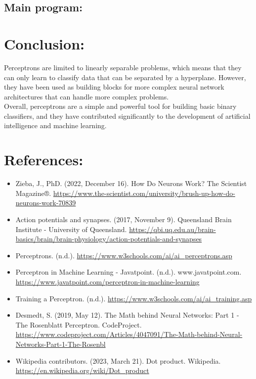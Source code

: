 \documentclass[12pt]{article}
\begin{document}
\subsection{Main program:}

\section{Conclusion:}
Perceptrons are limited to linearly separable problems, which means that they can only learn to
classify data that can be separated by a hyperplane. However, they have been used as building blocks
for more
complex neural network architectures that can handle more complex problems.\\
Overall, perceptrons are a simple and powerful tool for building basic binary classifiers, and
they have contributed significantly to the development of artificial intelligence and machine learning.


\section{References:}
\begin{itemize}
\item Zieba, J., PhD. (2022, December 16). How Do Neurons Work? The Scientist Magazine®.
  \url{https://www.the-scientist.com/university/brush-up-how-do-neurons-work-70839}
\item Action potentials and synapses. (2017, November 9). Queensland Brain Institute - University
  of Queensland.
  \url{https://qbi.uq.edu.au/brain-basics/brain/brain-physiology/action-potentials-and-synapses}
\item Perceptrons. (n.d.). \url{https://www.w3schools.com/ai/ai_perceptrons.asp}
\item Perceptron in Machine Learning - Javatpoint. (n.d.). www.javatpoint.com.
  \url{https://www.javatpoint.com/perceptron-in-machine-learning}
\item Training a Perceptron. (n.d.). \url{https://www.w3schools.com/ai/ai_training.asp}
\item Desmedt, S. (2019, May 12). The Math behind Neural Networks: Part 1 - The Rosenblatt Perceptron.
  CodeProject.
  \url{https://www.codeproject.com/Articles/4047091/The-Math-behind-Neural-Networks-Part-1-The-Rosenbl}
\item Wikipedia contributors. (2023, March 21). Dot product. Wikipedia.
  \url{https://en.wikipedia.org/wiki/Dot_product}
\end{itemize}
\end{document}

